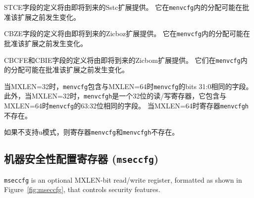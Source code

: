 {\iffalse
The definition of the STCE field will be furnished by the
forthcoming Sstc extension.
Its allocation within {\tt menvcfg} may change prior to the ratification
of that extension.

The definition of the CBZE field will be furnished by the
forthcoming Zicboz extension.
Its allocation within {\tt menvcfg} may change prior to the ratification
of that extension.
\fi
STCE字段的定义将由即将到来的Sstc扩展提供。
它在{\tt menvcfg}内的分配可能在批准该扩展之前发生变化。

CBZE字段的定义将由即将到来的Zicboz扩展提供。
它在{\tt menvcfg}内的分配可能在批准该扩展之前发生变化。

\iffalse
The definitions of the CBCFE and CBIE fields will be furnished by the
forthcoming Zicbom extension.
Their allocations within {\tt menvcfg} may change prior to the ratification
of that extension.

When MXLEN=32, {\tt menvcfg} contains the same fields as bits 31:0
of {\tt menvcfg} when MXLEN=64.
Additionally, when MXLEN=32, {\tt menvcfgh} is a 32-bit read/write register that
contains the same fields as bits 63:32 of {\tt menvcfg} when
MXLEN=64.
Register {\tt menvcfgh} does not exist when MXLEN=64.

If U-mode is not supported, then registers {\tt menvcfg} and {\tt menvcfgh} do
not exist.
\fi
CBCFE和CBIE字段的定义将由即将到来的Zicbom扩展提供。
它们在{\tt menvcfg}内的分配可能在批准该扩展之前发生变化。

当MXLEN=32时，{\tt menvcfg}包含与MXLEN=64时{\tt menvcfg}的bits 31:0相同的字段。
此外，当MXLEN=32时，{\tt menvcfgh}是一个32位的读/写寄存器，它包含与MXLEN=64时{\tt menvcfg}的63:32位相同的字段。
当MXLEN=64时寄存器{\tt menvcfgh}不存在。

如果不支持u模式，则寄存器{\tt menvcfg}和{\tt menvcfgh}不存在。

\subsection{机器安全性配置寄存器 ({\tt mseccfg})}
\label{sec:mseccfg}

\iffalse
{\tt mseccfg} is an optional MXLEN-bit read/write register, formatted as shown
in Figure~\ref{fig:mseccfg}, that controls security features.

}
